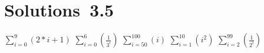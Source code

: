 \section*{Solutions~3.5}%

\begin{solutions}
\setcounter{solutioncounter}{7}
\solution 
\spart $\sum\limits_{i=0}^{9} (2*i + 1)$
\spart $\sum\limits_{i=0}^{6} (\frac{1}{3^i})$
\spart $\sum\limits_{i=50}^{100} (i)$
\spart $\sum\limits_{i=1}^{10} (i^2)$
\spart $\sum\limits_{i=2}^{99} (\frac{1}{2^i})$
\end{solutions}
